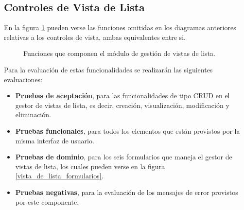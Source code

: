 \subsection{Controles de Vista de Lista}
En la figura \ref{vista_de_lista} pueden verse las funciones omitidas en los
diagramas anteriores relativas a los controles de vista, ambas equivalentes
entre si.

\begin{figure}
\centering
{}
\caption{Funciones que componen el módulo de gestión de vistas de lista.}
\label{vista_de_lista}
\end{figure}

Para la evaluación de estas funcionalidades se realizarán las siguientes
evaluaciones:

\begin{itemize}
\item \textbf{Pruebas de aceptación}, para las funcionalidades de tipo CRUD en
    el gestor de vistas de lista, es decir, creación, visualización,
    modificación y eliminación.
\item \textbf{Pruebas funcionales}, para todos los elementos que están provistos
    por la misma interfaz de usuario.
\item \textbf{Pruebas de dominio}, para los seis formularios que maneja el
    gestor de vistas de lista, los cuales pueden verse en la figura
    \ref{vista_de_lista_formularios}.
\item \textbf{Pruebas negativas}, para la evaluación de los mensajes de
    error provistos por este componente.
\end{itemize}

